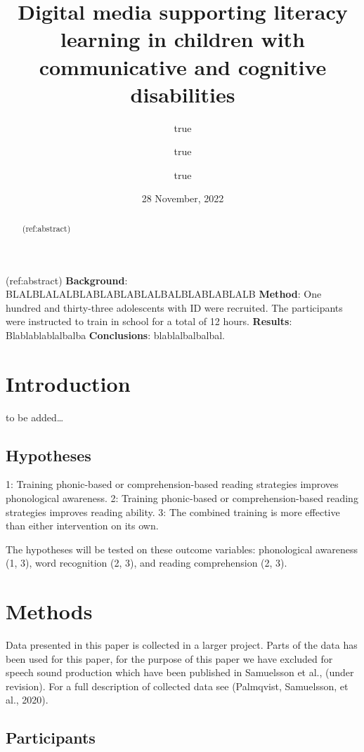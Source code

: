 \documentclass[
  ,
]{article}
\title{Digital media supporting literacy learning in children with
communicative and cognitive disabilities}
\author{true \and true \and true}
\date{28 November, 2022}
\begin{document}
\maketitle
\begin{abstract}
(ref:abstract)
\end{abstract}

(ref:abstract) \textbf{Background}:
BLALBLALALBLABLABLABLALBALBLABLABLALB \textbf{Method}: One hundred and
thirty-three adolescents with ID were recruited. The participants were
instructed to train in school for a total of 12 hours. \textbf{Results}:
Blablablablalbalba \textbf{Conclusions}: blablalbalbalbal.

\hypertarget{introduction}{%
\section{Introduction}\label{introduction}}

to be added\ldots{}

\hypertarget{hypotheses}{%
\subsection{Hypotheses}\label{hypotheses}}

1: Training phonic-based or comprehension-based reading strategies
improves phonological awareness. 2: Training phonic-based or
comprehension-based reading strategies improves reading ability. 3: The
combined training is more effective than either intervention on its own.

The hypotheses will be tested on these outcome variables: phonological
awareness (1, 3), word recognition (2, 3), and reading comprehension (2,
3).

\hypertarget{methods}{%
\section{Methods}\label{methods}}

Data presented in this paper is collected in a larger project. Parts of
the data has been used for this paper, for the purpose of this paper we
have excluded for speech sound production which have been published in
Samuelsson et al., (under revision). For a full description of collected
data see (Palmqvist, Samuelsson, et al., 2020).

\hypertarget{participants}{%
\subsection{Participants}\label{participants}}
\end{document}
